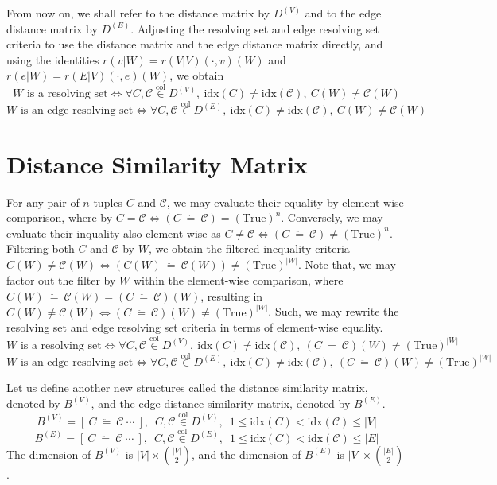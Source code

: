 \documentclass{article}
\begin{document}
From now on, we shall refer to the distance matrix by \(D^{(V)}\) and to the edge distance matrix by \(D^{(E)}\). Adjusting the resolving set and edge resolving set criteria to use the distance matrix and the edge distance matrix directly, and using the identities \(r(v|W) = r(V|V)(\cdot, v)(W)\) and \(r(e|W) = r(E|V)(\cdot, e)(W)\), we obtain
\[
	W \text{ is a resolving set} \iff \forall C, \mathcal{C} \overset{\mathrm{col}}{\in} D^{(V)},\ \mathrm{idx}(C) \neq \mathrm{idx}(\mathcal{C}),\ C(W) \neq \mathcal{C}(W)
\]
\[
	W \text{ is an edge resolving set} \iff \forall C, \mathcal{C} \overset{\mathrm{col}}{\in} D^{(E)},\ \mathrm{idx}(C) \neq \mathrm{idx}(\mathcal{C}),\ C(W) \neq \mathcal{C}(W)
\]

\section{Distance Similarity Matrix}

For any pair of \(n\)-tuples \(C\) and \(\mathcal{C}\), we may evaluate their equality by element-wise comparison, where by \({C = \mathcal{C}} \iff {(C\ \ddot{=}\ \mathcal{C}) = (\mathrm{True})^n}\). Conversely, we may evaluate their inquality also element-wise as \({C \neq \mathcal{C}} \iff {(C\ \ddot{=}\ \mathcal{C}) \neq (\mathrm{True})^n}\). Filtering both \(C\) and \(\mathcal{C}\) by \(W\), we obtain the filtered inequality criteria \({C(W) \neq \mathcal{C}(W)} \iff {(C(W)\ \ddot{=}\ \mathcal{C}(W)) \neq (\mathrm{True})^{|W|}}\). Note that, we may factor out the filter by \(W\) within the element-wise comparison, where \(C(W)\ \ddot{=}\ \mathcal{C}(W) = (C\ \ddot{=}\ \mathcal{C})(W)\), resulting in \({C(W) \neq \mathcal{C}(W)} \iff {(C\ \ddot{=}\ \mathcal{C})(W) \neq (\mathrm{True})^{|W|}}\). Such, we may rewrite the resolving set and edge resolving set criteria in terms of element-wise equality.
\[
	W \text{ is a resolving set} \iff \forall C, \mathcal{C} \overset{\mathrm{col}}{\in} D^{(V)},\ \mathrm{idx}(C) \neq \mathrm{idx}(\mathcal{C}),\ (C\ \ddot{=}\ \mathcal{C})(W) \neq (\mathrm{True})^{|W|}
\]
\[
	W \text{ is an edge resolving set} \iff \forall C, \mathcal{C} \overset{\mathrm{col}}{\in} D^{(E)},\ \mathrm{idx}(C) \neq \mathrm{idx}(\mathcal{C}),\ (C\ \ddot{=}\ \mathcal{C})(W) \neq (\mathrm{True})^{|W|}
\]

Let us define another new structures called the distance similarity matrix, denoted by \(B^{(V)}\), and the edge distance similarity matrix, denoted by \(B^{(E)}\).
\[
	B^{(V)} = \left[\ C\ \ddot{=}\ \mathcal{C}\ \cdots\ \right],\enspace C, \mathcal{C} \overset{\mathrm{col}}{\in} D^{(V)},\enspace 1 \leq \mathrm{idx}(C) < \mathrm{idx}(\mathcal{C}) \leq |V|
\]
\[
	B^{(E)} = \left[\ C\ \ddot{=}\ \mathcal{C}\ \cdots\ \right],\enspace C, \mathcal{C} \overset{\mathrm{col}}{\in} D^{(E)},\enspace 1 \leq \mathrm{idx}(C) < \mathrm{idx}(\mathcal{C}) \leq |E|
\]
The dimension of \(B^{(V)}\) is \(\displaystyle |V| \times \binom{|V|}{2}\), and the dimension of \(B^{(E)}\) is \(\displaystyle |V| \times \binom{|E|}{2}\).
\end{document}
